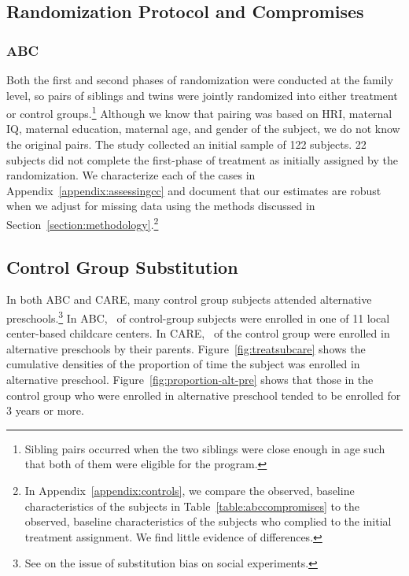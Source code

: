 \subsection{Randomization Protocol and Compromises} \label{section:randomization}

\subsubsection{ABC}

Both the first and second phases of randomization were conducted at the family level, so pairs of siblings and twins were jointly randomized into either treatment or control groups.\footnote{Sibling pairs occurred when the two siblings were close enough in age such that both of them were eligible for the program.} Although we know that pairing was based on HRI, maternal IQ, maternal education, maternal age, and gender of the subject, we do not know the original pairs. The study collected an initial sample of 122 subjects. 22 subjects did not complete the first-phase of treatment as initially assigned by the randomization. We characterize each of the cases in Appendix~\ref{appendix:assessingcc} and document that our estimates are robust when we adjust for missing data using the methods discussed in Section~\ref{section:methodology}.\footnote{In Appendix~\ref{appendix:controls}, we compare the observed, baseline characteristics of the subjects in Table~\ref{table:abccompromises} to the observed, baseline characteristics of the subjects who complied to the initial treatment assignment. We find little evidence of differences.}


\subsection{Control Group Substitution}

In both ABC and CARE, many control group subjects attended alternative preschools.\footnote{See \cite{Heckman_Hohmann_etal_2000_QJE} on the issue of substitution bias on social experiments.} In ABC, \treatsubsabc\ of control-group subjects were enrolled in one of 11 local center-based childcare centers. In CARE, \treatsubscarec\ of the control group were enrolled in alternative preschools by their parents. Figure~\ref{fig:treatsubcare} shows the cumulative densities of the proportion of time the subject was enrolled in alternative preschool. Figure~\ref{fig:proportion-alt-pre} shows that those in the control group who were enrolled in alternative preschool tended to be enrolled for 3 years or more.

